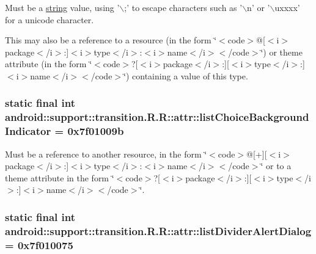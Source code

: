 Must be a \hyperlink{classandroid_1_1support_1_1transition_1_1_r_1_1string}{string} value, using '$\backslash$;' to escape characters such as '$\backslash$n' or '$\backslash$uxxxx' for a unicode character. 

This may also be a reference to a resource (in the form \char`\"{}$<$code$>$@\mbox{[}$<$i$>$package$<$/i$>$:\mbox{]}$<$i$>$type$<$/i$>$:$<$i$>$name$<$/i$>$$<$/code$>$\char`\"{}) or theme attribute (in the form \char`\"{}$<$code$>$?\mbox{[}$<$i$>$package$<$/i$>$:\mbox{]}\mbox{[}$<$i$>$type$<$/i$>$:\mbox{]}$<$i$>$name$<$/i$>$$<$/code$>$\char`\"{}) containing a value of this type. \hypertarget{classandroid_1_1support_1_1transition_1_1_r_1_1attr_4d85f023a18a936d18b589ac96fff8c3}{
\subsubsection[{listChoiceBackgroundIndicator}]{\setlength{\rightskip}{0pt plus 5cm}static final int android::support::transition.R.R::attr::listChoiceBackgroundIndicator = 0x7f01009b}}
\label{classandroid_1_1support_1_1transition_1_1_r_1_1attr_4d85f023a18a936d18b589ac96fff8c3}


Must be a reference to another resource, in the form \char`\"{}$<$code$>$@\mbox{[}+\mbox{]}\mbox{[}$<$i$>$package$<$/i$>$:\mbox{]}$<$i$>$type$<$/i$>$:$<$i$>$name$<$/i$>$$<$/code$>$\char`\"{} or to a theme attribute in the form \char`\"{}$<$code$>$?\mbox{[}$<$i$>$package$<$/i$>$:\mbox{]}\mbox{[}$<$i$>$type$<$/i$>$:\mbox{]}$<$i$>$name$<$/i$>$$<$/code$>$\char`\"{}. \hypertarget{classandroid_1_1support_1_1transition_1_1_r_1_1attr_8b3aa02c31c60df9e7074255ef44885e}{
\subsubsection[{listDividerAlertDialog}]{\setlength{\rightskip}{0pt plus 5cm}static final int android::support::transition.R.R::attr::listDividerAlertDialog = 0x7f010075}}
\label{classandroid_1_1support_1_1transition_1_1_r_1_1attr_8b3aa02c31c60df9e7074255ef44885e}


